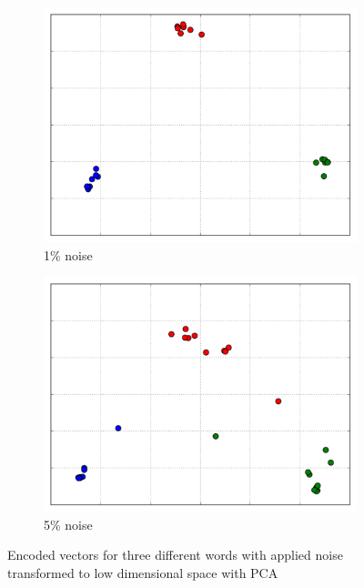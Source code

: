 \begin{figure}[!ht]
    \centering
    \begin{subfigure}{.5\textwidth}
        \centering
        \includegraphics[width=.9\linewidth]{fig/results/context_vector.png}
        \caption{1\% noise}
        \label{fig:context_vector_plot_1}
    \end{subfigure}%
    \begin{subfigure}{.5\textwidth}
        \centering
        \includegraphics[width=.9\linewidth]{fig/results/context_vector2.png}
        \caption{5\% noise}
        \label{fig:context_vector_plot_5}
    \end{subfigure}
    \captionsetup{justification=centering}
    \caption{Encoded vectors for three different words with applied noise transformed to low dimensional space with PCA}
    \label{fig:context_vector_plot}
\end{figure}